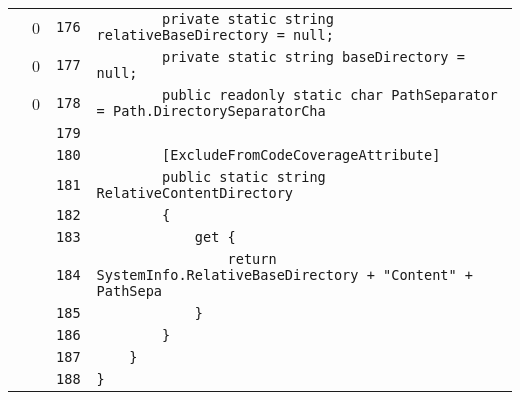 \documentclass[a4paper,10pt]{article}
\begin{document}
\begin{longtable}[l]{lrrl}
\cellcolor{red} & 0 & \verb~176~ & \verb~        private static string relativeBaseDirectory = null;~\\
\cellcolor{red} & 0 & \verb~177~ & \verb~        private static string baseDirectory = null;~\\
\cellcolor{red} & 0 & \verb~178~ & \verb~        public readonly static char PathSeparator = Path.DirectorySeparatorCha~\\
\cellcolor{gray} &  & \verb~179~ & \verb~~\\
\cellcolor{gray} &  & \verb~180~ & \verb~        [ExcludeFromCodeCoverageAttribute]~\\
\cellcolor{gray} &  & \verb~181~ & \verb~        public static string RelativeContentDirectory~\\
\cellcolor{gray} &  & \verb~182~ & \verb~        {~\\
\cellcolor{gray} &  & \verb~183~ & \verb~            get {~\\
\cellcolor{gray} &  & \verb~184~ & \verb~                return SystemInfo.RelativeBaseDirectory + "Content" + PathSepa~\\
\cellcolor{gray} &  & \verb~185~ & \verb~            }~\\
\cellcolor{gray} &  & \verb~186~ & \verb~        }~\\
\cellcolor{gray} &  & \verb~187~ & \verb~    }~\\
\cellcolor{gray} &  & \verb~188~ & \verb~}~\\
\end{longtable}
\end{document}
